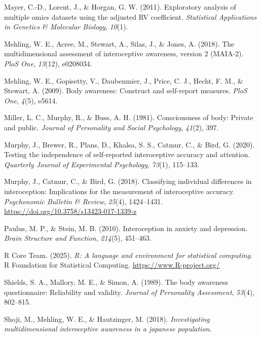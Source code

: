 \documentclass[
  man,
  floatsintext,
  longtable,
  nolmodern,
  notxfonts,
  notimes,
  mask,
  colorlinks=true,linkcolor=blue,citecolor=blue,urlcolor=blue]{apa7}
\newlength{\cslhangindent}
\newenvironment{CSLReferences}[2] %
 {\begin{list}{}{%
  \setlength{\itemindent}{0pt}
  \setlength{\leftmargin}{0pt}
  \setlength{\parsep}{0pt}
  \ifodd #1
   \setlength{\leftmargin}{\cslhangindent}
   \setlength{\itemindent}{-1\cslhangindent}
  \fi
  \setlength{\itemsep}{#2\baselineskip}}}
 {\end{list}}
\begin{document}
\begin{CSLReferences}{1}{0}
Mayer, C.-D., Lorent, J., \& Horgan, G. W. (2011). Exploratory analysis
of multiple omics datasets using the adjusted RV coefficient.
\emph{Statistical Applications in Genetics \& Molecular Biology},
\emph{10}(1).

Mehling, W. E., Acree, M., Stewart, A., Silas, J., \& Jones, A. (2018).
The multidimensional assessment of interoceptive awareness, version 2
(MAIA-2). \emph{PloS One}, \emph{13}(12), e0208034.

Mehling, W. E., Gopisetty, V., Daubenmier, J., Price, C. J., Hecht, F.
M., \& Stewart, A. (2009). Body awareness: Construct and self-report
measures. \emph{PloS One}, \emph{4}(5), e5614.

Miller, L. C., Murphy, R., \& Buss, A. H. (1981). Consciousness of body:
Private and public. \emph{Journal of Personality and Social Psychology},
\emph{41}(2), 397.

Murphy, J., Brewer, R., Plans, D., Khalsa, S. S., Catmur, C., \& Bird,
G. (2020). Testing the independence of self-reported interoceptive
accuracy and attention. \emph{Quarterly Journal of Experimental
Psychology}, \emph{73}(1), 115--133.

Murphy, J., Catmur, C., \& Bird, G. (2018). Classifying individual
differences in interoception: Implications for the measurement of
interoceptive accuracy. \emph{Psychonomic Bulletin \& Review},
\emph{25}(4), 1424--1431.
\url{https://doi.org/10.3758/s13423-017-1339-z}

Paulus, M. P., \& Stein, M. B. (2010). Interoception in anxiety and
depression. \emph{Brain Structure and Function}, \emph{214}(5),
451--463.

R Core Team. (2025). \emph{R: A language and environment for statistical
computing}. R Foundation for Statistical Computing.
\url{https://www.R-project.org/}

Shields, S. A., Mallory, M. E., \& Simon, A. (1989). The body awareness
questionnaire: Reliability and validity. \emph{Journal of Personality
Assessment}, \emph{53}(4), 802--815.

Shoji, M., Mehling, W. E., \& Hautzinger, M. (2018). \emph{Investigating
multidimensional interoceptive awareness in a japanese population}.


\end{CSLReferences}
\end{document}
